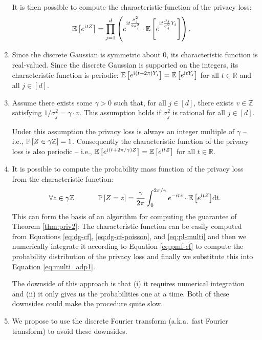 \documentclass{jpc}
\newcommand{\ii}{\mathrm{i}\mkern1mu}
\newcommand{\ex}[2]{{\ifx&#1& \mathbb{E} \else
\underset{#1}{\mathbb{E}} \fi \left[#2\right]}}
\newcommand{\pr}[2]{{\ifx&#1& \mathbb{P} \else
\underset{#1}{\mathbb{P}} \fi \left[#2\right]}}
\newcommand{\dx}[1][x]{\mathrm{d}#1}
\newcommand{\Z}{\mathbb{Z}}
\newcommand{\R}{\mathbb{R}}
\begin{document}
\begin{enumerate}
    It is then possible to compute the characteristic function of the privacy loss:
    \begin{align}
        \ex{}{e^{\ii{}tZ}} &= \prod_{j=1}^d \left( e^{\ii{}t \frac{\mu_j^2}{2\sigma_j^2}}\cdot \ex{}{e^{\ii{} t \frac{\mu_j}{\sigma_j^2} Y_j}} \right).\label{eq:pl-multi}
    \end{align}
    
    \item Since the discrete Gaussian is symmetric about $0$, its characteristic function is real-valued. Since the discrete Gaussian is supported on the integers, its characteristic function is periodic: $\ex{}{e^{\ii{}(t+2\pi)Y_j}} = \ex{}{e^{\ii{}tY_j}}$ for all $t \in \R$ and all $j \in [d]$.
    
    \item Assume there exists some $\gamma>0$ such that, for all $j \in [d]$, there exists $v \in \Z$ satisfying $1/\sigma_j^2 = \gamma \cdot v$. 
    This assumption holds if $\sigma_j^2$ is rational for all $j \in [d]$.
    
    Under this assumption the privacy loss is always an integer multiple of $\gamma$ -- i.e., $\pr{}{Z \in \gamma \Z}=1$.
    Consequently the characteristic function of the privacy loss is also periodic -- i.e., $\ex{}{e^{\ii{}(t+2\pi/\gamma)Z}} = \ex{}{e^{\ii{}tZ}}$ for all $t \in \R$.
    
    \item It is possible to compute the probability mass function of the privacy loss from the characteristic function:
    \begin{equation}
        \forall z \in \gamma \Z ~~~~~~~~~~ \pr{}{Z=z} = \frac{\gamma}{2\pi} \int_0^{2\pi/\gamma} e^{-itz} \cdot \ex{}{e^{\ii{}tZ}} \dx[t]. \label{eq:pmf-cf}
    \end{equation}
    This can form the basis of an algorithm for computing the guarantee of Theorem \ref{thm:priv2}: The characteristic function can be easily computed from Equations \ref{eq:dg-cf}, \ref{eq:dg-cf-poisson}, and \ref{eq:pl-multi} and then we numerically integrate it according to Equation \ref{eq:pmf-cf} to compute the probability distribution of the privacy loss and finally we substitute this into Equation \ref{eq:multi_adp1}.
    
    The downside of this approach is that (i) it requires numerical integration and (ii) it only gives us the probabilities one at a time. Both of these downsides could make the procedure quite slow.
    
    \item We propose to use the discrete Fourier transform (a.k.a.~fast Fourier transform) to avoid these downsides.
    

\end{enumerate}
\end{document}
